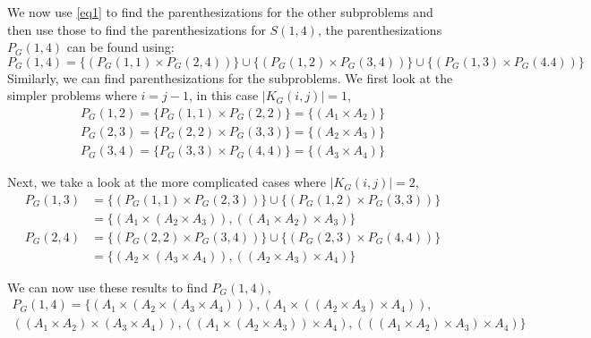 \documentclass[12pt, a4paper]{article}
\theoremstyle{remark}
\newtheorem*{example}{Example}
\begin{document}
    We now use \ref{eq1} to find the parenthesizations for the other subproblems and then use 
    those to find the parenthesizations for $S(1,4)$, the parenthesizations $P_G(1,4)$ can be found using:
    \[P_G(1,4) = \{(P_G(1,1) \times P_G(2,4))\} \cup \{(P_G(1,2) \times P_G(3,4))\} \cup \{(P_G(1,3) \times P_G(4.4))\}\]
    Similarly, we can find parenthesizations for the subproblems. We first look at the simpler problems where 
    $i = j-1$, in this case $\lvert K_G(i,j) \rvert = 1$,
    \begin{equation*}
        \begin{split}
            P_G(1,2) = \{P_G(1,1) \times P_G(2,2)\} = \{(A_1 \times A_2)\} \\ 
            P_G(2,3) = \{P_G(2,2) \times P_G(3,3)\} = \{(A_2 \times A_3)\}\\
            P_G(3,4) = \{P_G(3,3) \times P_G(4,4)\} = \{(A_3 \times A_4)\}
        \end{split}
    \end{equation*}
    
    Next, we take a look at the more complicated cases where $\lvert K_G(i,j) \rvert = 2$,
    \begin{equation*}
        \begin{split}
            P_G(1,3) & = \{(P_G(1,1) \times P_G(2,3))\} \cup \{(P_G(1,2) \times P_G(3,3))\} \\
            & = \{(A_1 \times (A_2 \times A_3)), ((A_1 \times A_2) \times A_3)\} \\
            P_G(2,4) & = \{(P_G(2,2) \times P_G(3,4))\} \cup \{(P_G(2,3) \times P_G(4,4))\} \\
            & = \{(A_2 \times (A_3 \times A_4)), ((A_2 \times A_3) \times A_4)\}
        \end{split}
    \end{equation*} 

    We can now use these results to find $P_G(1,4)$,
    \begin{multline*}
        P_G(1,4) = \{(A_1 \times (A_2 \times (A_3 \times A_4))), (A_1 \times ((A_2 \times A_3) \times A_4)), 
         \\((A_1 \times A_2) \times (A_3 \times A_4)), ((A_1 \times (A_2 \times A_3)) \times A_4),
         (((A_1 \times A_2) \times A_3) \times A_4)\}
    \end{multline*}
\end{document}
